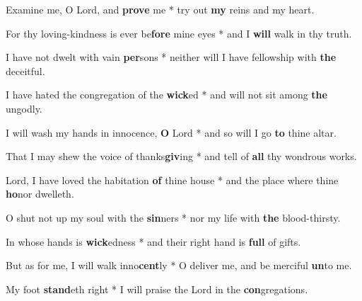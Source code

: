 \begin{multicols}{2}
	Examine me, O Lord, and \textbf{prove} me * try out \textbf{my} reins and my heart.
	
	For thy loving-kindness is ever be\textbf{fore} mine eyes * and I \textbf{will} walk in thy truth.
	
	I have not dwelt with vain \textbf{per}sons * neither will I have fellowship with \textbf{the} deceitful.
	
	I have hated the congregation of the \textbf{wick}ed * and will not sit among \textbf{the} ungodly.
	
	I will wash my hands in innocence, \textbf{O} Lord * and so will I go \textbf{to} thine altar.
	
	That I may shew the voice of thanks\textbf{giv}ing * and tell of \textbf{all} thy wondrous works.
	
	Lord, I have loved the habitation \textbf{of} thine house * and the place where thine \textbf{ho}nor dwelleth.
	
	O shut not up my soul with the \textbf{sin}ners * nor my life with \textbf{the} blood-thirsty.
	
	In whose hands is \textbf{wick}edness * and their right hand is \textbf{full} of gifts.
	
	But as for me, I will walk inno\textbf{cent}ly * O deliver me, and be merciful \textbf{un}to me.
	
	My foot \textbf{stand}eth right * I will praise the Lord in the \textbf{con}gregations.
\end{multicols}